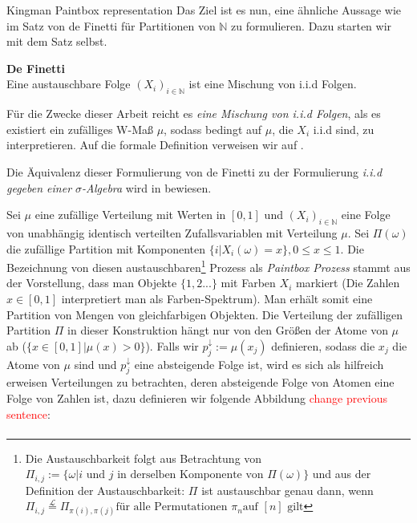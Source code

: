 \begin{section}{Kingman Paintbox representation}
Das Ziel ist es nun, eine ähnliche Aussage wie im Satz von de Finetti für Partitionen von $\mathbb{N}$ zu formulieren. Dazu starten wir mit dem Satz selbst.
\begin{theorem}\cite[Theorem 3.1]{aldous2006ecole}{\textbf{De Finetti}}\\
    Eine austauschbare Folge $(X_i)_{i \in \mathbb{N}}$ ist eine Mischung von i.i.d Folgen.
\end{theorem}
\begin{Bemerkung}
    Für die Zwecke dieser Arbeit reicht es \textit{eine Mischung von i.i.d Folgen}, als \glqq es existiert ein zufälliges W-Maß $\mu$, sodass bedingt auf $\mu$, die $X_i$ i.i.d sind\grqq, zu interpretieren. Auf die formale Definition verweisen wir auf \cite[Abschnitt 1.2]{aldous2006ecole}.
\end{Bemerkung}
\begin{Bemerkung}
    Die Äquivalenz dieser Formulierung von de Finetti zu der Formulierung \textit{i.i.d gegeben einer $\sigma$-Algebra} wird in \cite[Lemma 2.18]{aldous2006ecole} bewiesen.  
\end{Bemerkung}
Sei $\mu$ eine zufällige Verteilung mit Werten in $[0,1]$ und $(X_i)_{i \in \mathbb{N}}$ eine Folge von unabhängig identisch verteilten Zufallsvariablen mit Verteilung $\mu$. Sei $\Pi(\omega)$ die zufällige Partition mit Komponenten $\{i| X_i(\omega) = x\},  0 \leq x \leq 1$. Die Bezeichnung von diesen austauschbaren\footnote{Die Austauschbarkeit folgt aus Betrachtung von $\Pi_{i,j} := \{\omega | i \text{ und } j \text{ in derselben Komponente von } \Pi(\omega)\}$ und aus der Definition der Austauschbarkeit: $\Pi$ ist austauschbar genau dann, wenn $\Pi_{i,j} \stackrel{\mathcal{L}}{=} \Pi_{\pi(i),\pi(j)} \text{für alle Permutationen }\pi_n \text{auf }[n] \text{ gilt}$} Prozess als \textit{Paintbox Prozess} stammt aus der Vorstellung, dass man Objekte $\{1,2 ...\}$ mit Farben $X_i$ markiert (Die Zahlen $x \in [0,1]$ interpretiert man als Farben-Spektrum). 
Man erhält somit eine Partition von Mengen von gleichfarbigen Objekten. Die Verteilung der zufälligen Partition $\Pi$ in dieser Konstruktion hängt nur von den Größen der Atome von $\mu$ ab ($\{x \in [0,1] | \mu(x) > 0 \}$). Falls wir $p^\downarrow_j := \mu(x_j)$ definieren, sodass die $x_j$ die Atome von $\mu$ sind und $p_j^\downarrow$ eine absteigende Folge ist, wird es sich als hilfreich erweisen Verteilungen zu betrachten, deren absteigende Folge von Atomen eine Folge von Zahlen ist, dazu definieren wir folgende Abbildung \textcolor{red}{change previous sentence}:
\begin{align*}

\end{align*}
\end{section}
